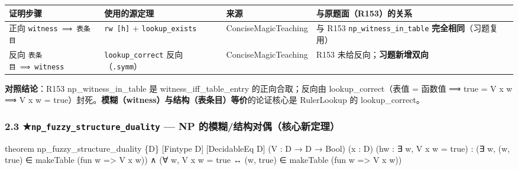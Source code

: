 \documentclass[
]{article}
\newenvironment{Shaded}{}{}
\newcommand{\NormalTok}[1]{#1}
\newcounter{none} %
\begin{document}
{\def\LTcaptype{none} %
\begin{longtable}[]{@{}
  >{\raggedright\arraybackslash}p{}
  >{\raggedright\arraybackslash}p{}
  >{\raggedright\arraybackslash}p{}
  >{\raggedright\arraybackslash}p{}@{}}
\toprule\noalign{}
\begin{minipage}[b]{\linewidth}\raggedright
证明步骤
\end{minipage} & \begin{minipage}[b]{\linewidth}\raggedright
使用的源定理
\end{minipage} & \begin{minipage}[b]{\linewidth}\raggedright
来源
\end{minipage} & \begin{minipage}[b]{\linewidth}\raggedright
与原题面（R153）的关系
\end{minipage} \\
\midrule\noalign{}
\endhead
\bottomrule\noalign{}
\endlastfoot
正向 \texttt{witness\ ⟹\ 表条目} & \texttt{rw\ {[}h{]}} +
\texttt{lookup\_exists} & ConciseMagicTeaching & 与 R153
\texttt{np\_witness\_in\_table} \textbf{完全相同}（习题复用） \\
反向 \texttt{表条目\ ⟹\ witness} & \texttt{lookup\_correct}
反向（\texttt{.symm}） & ConciseMagicTeaching & R153
未给反向；\textbf{习题新增双向} \\
\end{longtable}
}

\textbf{对照结论}：R153 np\_witness\_in\_table 是
witness\_iff\_table\_entry 的正向合取；反向由 lookup\_correct（表值 =
函数值 ⟹ true = V x w ⟹ V x w =
true）封死。\textbf{模糊（witness）与结构（表条目）等价}的论证核心是
RulerLookup 的 lookup\_correct。

\subsubsection{\texorpdfstring{2.3
★\texttt{np\_fuzzy\_structure\_duality} --- NP
的模糊/结构对偶（核心新定理）}{2.3 ★np\_fuzzy\_structure\_duality --- NP 的模糊/结构对偶（核心新定理）}}\label{np_fuzzy_structure_duality-np-ux7684ux6a21ux7ccaux7ed3ux6784ux5bf9ux5076ux6838ux5fc3ux65b0ux5b9aux7406}

\begin{Shaded}
\begin{Highlighting}[]
\NormalTok{theorem np\_fuzzy\_structure\_duality \{D\} [Fintype D] [DecidableEq D]}
\NormalTok{    (V : D → D → Bool) (x : D) (hw : ∃ w, V x w = true) :}
\NormalTok{    (∃ w, (w, true) ∈ makeTable (fun w =\textgreater{} V x w)) ∧}
\NormalTok{    (∀ w, V x w = true ↔ (w, true) ∈ makeTable (fun w =\textgreater{} V x w))}
\end{Highlighting}
\end{Shaded}
\end{document}
